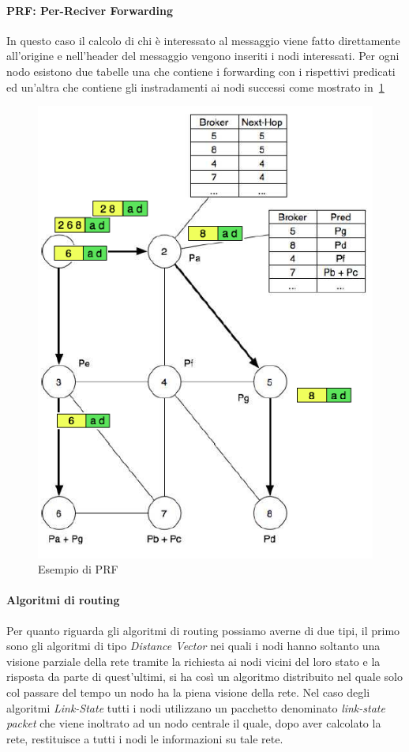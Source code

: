 \paragraph{PRF: Per-Reciver Forwarding}
In questo caso il calcolo di chi è interessato al messaggio viene fatto direttamente all'origine e nell'header del messaggio vengono inseriti i nodi interessati. Per ogni nodo esistono due tabelle una che contiene i forwarding con i rispettivi predicati ed un'altra che contiene gli instradamenti ai nodi successi come mostrato in \figurename\,\ref{img:prf}
\begin{figure}
\centering
\includegraphics[scale=0.5]{img/prf.png}
\caption{Esempio di PRF}\label{img:prf}
\end{figure}
\paragraph{Algoritmi di routing}
Per quanto riguarda gli algoritmi di routing possiamo averne di due tipi, il primo sono gli algoritmi di tipo \emph{Distance Vector} nei quali i nodi hanno soltanto una visione parziale della rete tramite la richiesta ai nodi vicini del loro stato e la risposta da parte di quest'ultimi, si ha così un algoritmo distribuito nel quale solo col passare del tempo un nodo ha la piena visione della rete. Nel caso degli algoritmi \emph{Link-State} tutti i nodi utilizzano un pacchetto denominato \emph{link-state packet} che viene inoltrato ad un nodo centrale il quale, dopo aver calcolato la rete, restituisce a tutti i nodi le informazioni su tale rete.
